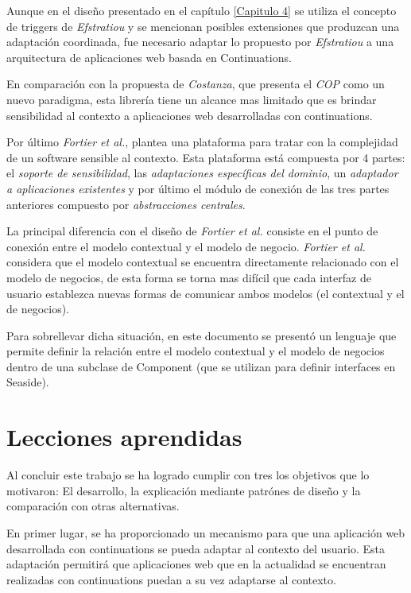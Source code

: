 Aunque en el diseño presentado en el capítulo \ref{Capitulo 4} se utiliza el concepto de triggers de \emph{Efstratiou} y se mencionan posibles extensiones que produzcan una adaptación coordinada, fue necesario adaptar lo propuesto por \emph{Efstratiou} a una arquitectura de aplicaciones web basada en Continuations.

En comparación con la propuesta de \emph{Costanza}\cite{Costanza08}, que presenta el \emph{COP} como un nuevo paradigma, esta librería tiene un alcance mas limitado que es brindar sensibilidad al contexto a aplicaciones web desarrolladas con continuations.

Por último \emph{Fortier et al.}\cite{Fortier09}, plantea una plataforma para tratar con la complejidad de un software sensible al contexto. Esta plataforma está compuesta por 4 partes: el \emph{soporte de sensibilidad}, las \emph{adaptaciones específicas del dominio}, un \emph{adaptador a aplicaciones existentes} y por último el módulo de conexión de las tres partes anteriores compuesto por \emph{abstracciones centrales}.

La principal diferencia con el diseño de \emph{Fortier et al.} consiste en el punto de conexión entre el modelo contextual y el modelo de negocio. \emph{Fortier et al.} considera que el modelo contextual se encuentra directamente relacionado con el modelo de negocios, de esta forma se torna mas difícil que cada interfaz de usuario establezca nuevas formas de comunicar ambos modelos (el contextual y el de negocios).

Para sobrellevar dicha situación, en este documento se presentó un lenguaje que permite definir la relación entre el modelo contextual y el modelo de negocios dentro de una subclase de Component (que se utilizan para definir interfaces en Seaside).


\section{Lecciones aprendidas}

Al concluir este trabajo se ha logrado cumplir con tres los objetivos que lo motivaron: El desarrollo, la explicación mediante patrónes de diseño y la comparación con otras alternativas. 

En primer lugar, se ha proporcionado un mecanismo para que una aplicación web desarrollada con continuations se pueda adaptar al contexto del usuario. Esta adaptación permitirá que aplicaciones web que en la actualidad se encuentran realizadas con continuations puedan a su vez adaptarse al contexto.

